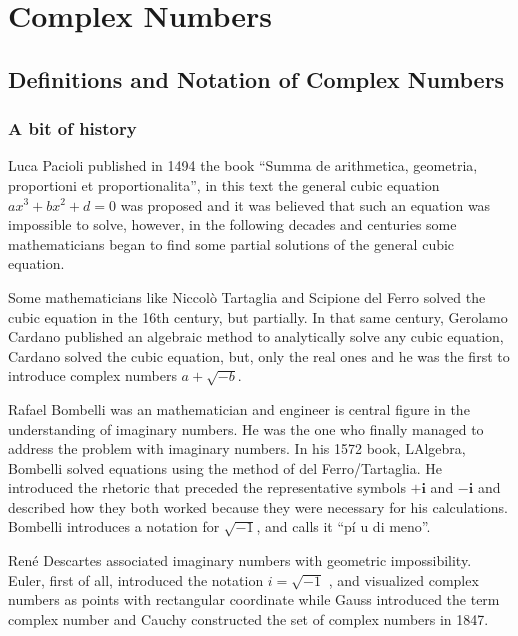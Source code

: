 
\section{Complex Numbers}

\subsection{Definitions and Notation of Complex Numbers}

\subsubsection{A bit of history}

Luca Pacioli published in 1494 the book ``Summa de arithmetica, geometria, proportioni  et  proportionalita'',  in  this  text  the  general  cubic  equation $a x^3 + b x^2 + d = 0$  was proposed and it was believed that such an equation was impossible  to  solve,  however,  in  the  following  decades  and  centuries  some mathematicians  began  to  find  some  partial  solutions  of  the  general  cubic equation. 
\bigskip

Some mathematicians like  Niccolò Tartaglia and Scipione del Ferro solved the cubic equation in the 16th century, but partially. In that same century, Gerolamo Cardano published an algebraic method to analytically solve any cubic equation, Cardano solved the cubic equation, but, only the real ones and he was the first to introduce complex numbers $a + \sqrt{-b}$. 
\bigskip

Rafael Bombelli was an mathematician and engineer is central figure in the understanding of imaginary numbers. He was the one who finally managed to address  the  problem  with  imaginary  numbers.  In  his  1572  book,  L\textquotesingle Algebra, Bombelli  solved  equations  using  the  method  of  del Ferro/Tartaglia.  He introduced the rhetoric that preceded the representative symbols $\mathbf{+i}$ and $\mathbf{-i}$ and described  how  they  both  worked  because  they  were  necessary  for  his calculations. Bombelli introduces a notation for $\sqrt{-1}$, and calls it ``pí u di meno''. 
\bigskip

René  Descartes  associated  imaginary  numbers  with  geometric  impossibility. Euler, first of all, introduced the notation $i = \sqrt{-1}$ , and visualized complex numbers as points with rectangular coordinate while Gauss introduced the term complex number and Cauchy constructed the set of complex numbers in 1847.
\bigskip


